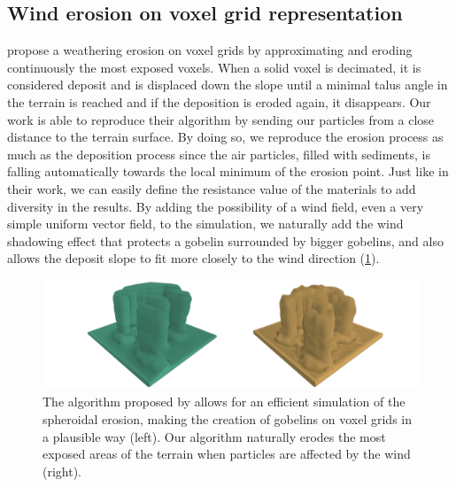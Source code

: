 \subsection{Wind erosion on voxel grid representation}
\citep{Jones2010} propose a weathering erosion on voxel grids by approximating and eroding continuously the most exposed voxels. When a solid voxel is decimated, it is considered deposit and is displaced down the slope until a minimal talus angle in the terrain is reached and if the deposition is eroded again, it disappears. Our work is able to reproduce their algorithm by sending our particles from a close distance to the terrain surface. By doing so, we reproduce the erosion process as much as the deposition process since the air particles, filled with sediments, is falling automatically towards the local minimum of the erosion point. Just like in their work, we can easily define the resistance value of the materials to add diversity in the results. By adding the possibility of a wind field, even a very simple uniform vector field, to the simulation, we naturally add the wind shadowing effect that protects a gobelin surrounded by bigger gobelins, and also allows the deposit slope to fit more closely to the wind direction (\cref{fig:erosion_screen-jones2010}).

\begin{figure}[ht]
    \centering
    \includegraphics[width = \linewidth]{gobelins2.png}
    \caption{The algorithm proposed by \cite{Jones2010} allows for an efficient simulation of the spheroidal erosion, making the creation of gobelins on voxel grids in a plausible way (left). Our algorithm naturally erodes the most exposed areas of the terrain when particles are affected by the wind (right).}
    \label{fig:erosion_screen-jones2010}
\end{figure}


